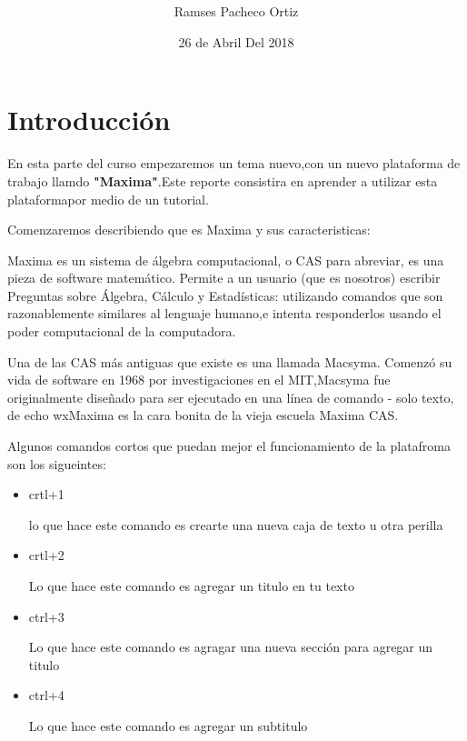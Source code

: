 \documentclass{article}
\begin{document}
\title{ }
\author{Ramses Pacheco Ortiz}
\date{26 de Abril Del 2018}
\maketitle  


\section{Introducción}

En esta parte del curso empezaremos un tema nuevo,con un nuevo plataforma de trabajo llamdo \textbf{"Maxima"}.Este reporte consistira en aprender a utilizar esta plataformapor medio de un tutorial.

\vspace{.1cm}

Comenzaremos describiendo que es Maxima y sus caracteristicas:

Maxima es un sistema de álgebra computacional, o CAS para abreviar, es una pieza de software matemático. Permite a un usuario (que es nosotros) escribir
Preguntas sobre Álgebra, Cálculo y Estadísticas: utilizando comandos que son razonablemente similares al lenguaje humano,e intenta responderlos usando el poder computacional de la computadora.

Una de las CAS más antiguas que existe es una llamada Macsyma. Comenzó su vida de software en 1968 por investigaciones en el MIT,Macsyma fue originalmente diseñado para ser ejecutado en una línea de comando - solo texto, de echo wxMaxima es la cara bonita de la vieja escuela Maxima CAS.

\vspace{0.1cm}

Algunos comandos cortos que puedan mejor el funcionamiento de la platafroma son los sigueintes:

\begin{itemize}
\item crtl+1
 
 
 lo que hace este comando es crearte una nueva caja de texto u otra perilla

\item crtl+2 

Lo que hace este comando es agregar un titulo en tu texto

\item  ctrl+3


Lo que hace este comando es agragar una nueva sección para agregar un titulo


\item ctrl+4


Lo que hace este comando es agregar un subtitulo




\end{itemize}
\end{document}
